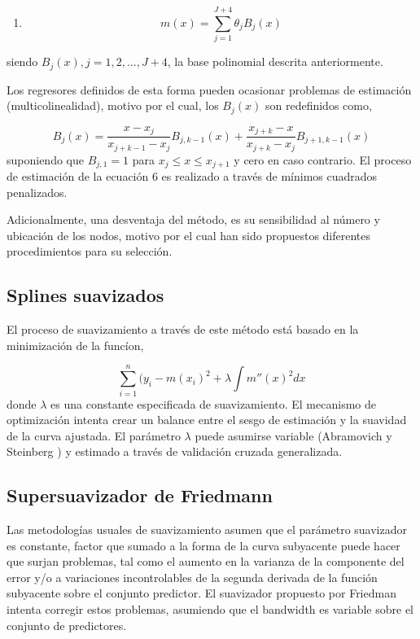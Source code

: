 \documentclass[
  12pt,
]{krantz}
\providecommand{\tightlist}{%
  \setlength{\itemsep}{0pt}\setlength{\parskip}{0pt}}
\begin{document}
\begin{enumerate}
\def\labelenumi{(\arabic{enumi})}
\setcounter{enumi}{5}
\tightlist
\item
  \[
  m(x) = \sum_{j=1}^{J+4} \theta_{j}B_{j}(x) 
  \]
\end{enumerate}

siendo \(B_{j}(x), j = 1, 2,... , J+4\), la base polinomial descrita anteriormente.

Los regresores definidos de esta forma pueden ocasionar problemas de estimación (multicolinealidad), motivo por el cual, los \(B_{j}(x)\) son
redefinidos como,

\[\displaystyle{ B_{j}(x) = \frac{x-x_{j}}{x_{j+k-1}-x_{j}} B_{j,k-1}(x) + \frac{x_{j+k}-x}{x_{j+k}-x_{j}} B_{j+1,k-1}(x) }\]
suponiendo que \(B_{j,1}=1\) para \(x_{j} \leq x \leq x_{j+1}\) y cero en caso contrario. El proceso de estimación de la ecuación 6 es realizado a través de mínimos cuadrados penalizados.

Adicionalmente, una desventaja del método, es su sensibilidad al número y ubicación de los nodos, motivo por el cual han sido propuestos diferentes procedimientos para su selección.

\hypertarget{splines-suavizados-1}{%
\subsection{Splines suavizados}\label{splines-suavizados-1}}

El proceso de suavizamiento a través de este método está basado en la minimización de la funcíon,

\[\displaystyle{ \sum_{i=1}^{n} (y_{i}-m(x_{i})^2 + \lambda \int m''(x)^2dx  }\]
donde \(\lambda\) es una constante especificada de suavizamiento. El mecanismo de optimización intenta crear un balance entre el sesgo de estimación y la suavidad de la curva ajustada. El parámetro \(\lambda\) puede asumirse variable (Abramovich y Steinberg \cite{AS}) y estimado a través de validación cruzada generalizada.

\hypertarget{supersuavizador-de-friedmann}{%
\subsection{Supersuavizador de Friedmann}\label{supersuavizador-de-friedmann}}

Las metodologías usuales de suavizamiento asumen que el parámetro suavizador es constante, factor que sumado a la forma de la curva subyacente puede hacer que surjan problemas, tal como el aumento en la varianza de la componente del error y/o a variaciones incontrolables de la segunda derivada de la función subyacente sobre el conjunto predictor. El suavizador propuesto por Friedman \cite{F} intenta corregir estos problemas, asumiendo que el bandwidth es variable sobre el conjunto de predictores.
\end{document}

